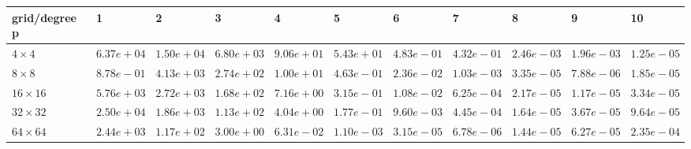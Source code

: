\begin{tabular}{lllllllllll}
\hline
 grid/degree p   & 1          & 2          & 3          & 4          & 5          & 6          & 7          & 8          & 9          & 10         \\
\hline
 $4 \times 4$    & $6.37e+04$ & $1.50e+04$ & $6.80e+03$ & $9.06e+01$ & $5.43e+01$ & $4.83e-01$ & $4.32e-01$ & $2.46e-03$ & $1.96e-03$ & $1.25e-05$ \\
 $8 \times 8$    & $8.78e-01$ & $4.13e+03$ & $2.74e+02$ & $1.00e+01$ & $4.63e-01$ & $2.36e-02$ & $1.03e-03$ & $3.35e-05$ & $7.88e-06$ & $1.85e-05$ \\
 $16 \times 16$  & $5.76e+03$ & $2.72e+03$ & $1.68e+02$ & $7.16e+00$ & $3.15e-01$ & $1.08e-02$ & $6.25e-04$ & $2.17e-05$ & $1.17e-05$ & $3.34e-05$ \\
 $32 \times 32$  & $2.50e+04$ & $1.86e+03$ & $1.13e+02$ & $4.04e+00$ & $1.77e-01$ & $9.60e-03$ & $4.45e-04$ & $1.64e-05$ & $3.67e-05$ & $9.64e-05$ \\
 $64 \times 64$  & $2.44e+03$ & $1.17e+02$ & $3.00e+00$ & $6.31e-02$ & $1.10e-03$ & $3.15e-05$ & $6.78e-06$ & $1.44e-05$ & $6.27e-05$ & $2.35e-04$ \\
\hline
\end{tabular}